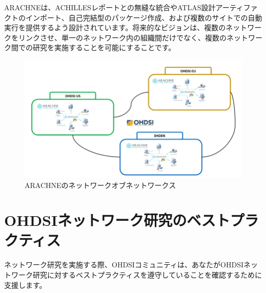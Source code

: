 \documentclass[
  11pt]{book}
\theoremstyle{definition}
\theoremstyle{definition}
\theoremstyle{definition}
\theoremstyle{definition}
\theoremstyle{remark}
\begin{document}
ARACHNEは、ACHILLESレポートとの無縫な統合やATLAS設計アーティファクトのインポート、自己完結型のパッケージ作成、および複数のサイトでの自動実行を提供するよう設計されています。将来的なビジョンは、複数のネットワークをリンクさせ、単一のネットワーク内の組織間だけでなく、複数のネットワーク間での研究を実施することを可能にすることです。

\begin{figure}[h]

{\centering \includegraphics[width=0.9\linewidth]{images/NetworkStudies/ARACHNENON} 

}

\caption{ARACHNEのネットワークオブネットワークス}\label{fig:arachneNon}
\end{figure}

\section{OHDSIネットワーク研究のベストプラクティス}\label{ohdsiux30cdux30c3ux30c8ux30efux30fcux30afux7814ux7a76ux306eux30d9ux30b9ux30c8ux30d7ux30e9ux30afux30c6ux30a3ux30b9}


ネットワーク研究を実施する際、OHDSIコミュニティは、あなたがOHDSIネットワーク研究に対するベストプラクティスを遵守していることを確認するために支援します。
\end{document}
